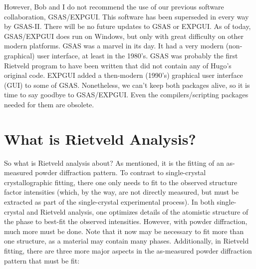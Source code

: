 However, Bob and I do not recommend the use of our previous software collaboration, GSAS/EXPGUI. This software has been superseded in every way by GSAS-II. There will be no future updates to GSAS or EXPGUI. As of today, GSAS/EXPGUI does run on Windows, but only with great difficulty on other modern platforms. GSAS was a marvel in its day. It had a very modern (non-graphical) user interface, at least in the 1980's. GSAS was probably the first Rietveld program to have been written that did not contain any of Hugo’s original code. EXPGUI added a then-modern (1990's) graphical user interface (GUI) to some of GSAS. Nonetheless, we can't keep both packages alive, so it is time to say goodbye to GSAS/EXPGUI. Even the compilers/scripting packages needed for them are obsolete.

\section{What is Rietveld Analysis?} 
So what is Rietveld analysis about? As mentioned, it is the fitting of an as-measured powder diffraction pattern. To contrast to single-crystal crystallographic fitting, there one only needs to fit to the observed structure factor intensities (which, by the way, are not directly measured, but must be extracted as part of the single-crystal experimental process). In both single-crystal and Rietveld analysis, one optimizes details of the atomistic structure of the phase to best-fit the observed intensities. However, with powder diffraction, much more must be done. Note that it now may be necessary to fit more than one structure, as a material may contain many phases. Additionally, in Rietveld fitting, there are three more major aspects in the as-measured powder diffraction pattern that must be fit: 

